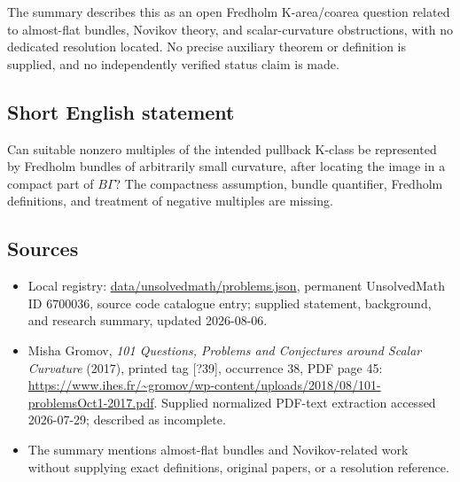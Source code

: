 \documentclass[11pt]{article}
\begin{document}
The summary describes this as an open Fredholm K-area/coarea question related to almost-flat bundles, Novikov theory, and scalar-curvature obstructions, with no dedicated resolution located. No precise auxiliary theorem or definition is supplied, and no independently verified status claim is made.
\subsection{Short English statement}
Can suitable nonzero multiples of the intended pullback K-class be represented by Fredholm bundles of arbitrarily small curvature, after locating the image in a compact part of \(B\Gamma\)? The compactness assumption, bundle quantifier, Fredholm definitions, and treatment of negative multiples are missing.
\subsection{Sources}
\begin{itemize}
\item Local registry: \url{data/unsolvedmath/problems.json}, permanent UnsolvedMath ID \(6700036\), source code catalogue entry; supplied statement, background, and research summary, updated 2026-08-06.
\item Misha Gromov, \emph{101 Questions, Problems and Conjectures around Scalar Curvature} (2017), printed tag [?39], occurrence 38, PDF page 45: \url{https://www.ihes.fr/~gromov/wp-content/uploads/2018/08/101-problemsOct1-2017.pdf}. Supplied normalized PDF-text extraction accessed 2026-07-29; described as incomplete.
\item The summary mentions almost-flat bundles and Novikov-related work without supplying exact definitions, original papers, or a resolution reference.
\end{itemize}
\end{document}
